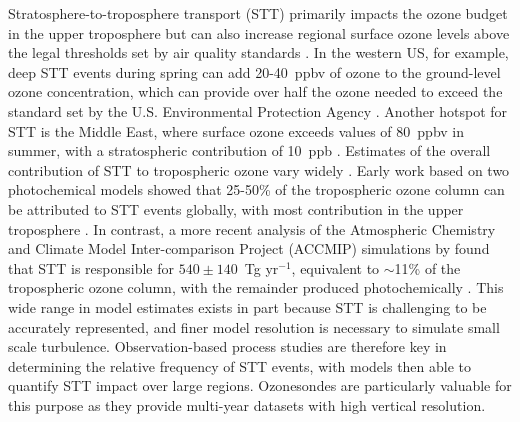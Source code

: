 \documentclass[acp, manuscript]{copernicus} %
\begin{document}
  Stratosphere-to-troposphere transport (STT) primarily impacts the ozone budget in the upper troposphere but can also increase regional surface ozone levels above the legal thresholds set by air quality standards \citep{Danielson1968, Lelieveld2009, Lefohn2011, Langford2012, Zhang2014, Lin2015}.
  In the western US, for example, deep STT events during spring can add 20-40~ppbv of ozone to the ground-level ozone concentration, which can provide over half the ozone needed to exceed the standard set by the U.S. Environmental Protection Agency \citep{Lin2012, Lin2015}.
  Another hotspot for STT is the Middle East, where surface ozone exceeds values of 80~ppbv in summer, with a stratospheric contribution of 10~ppb \citep{Lelieveld2009}.
  Estimates of the overall contribution of STT to tropospheric ozone vary widely \citep[e.g.][]{Galani2003, Stohl2003, Stevenson2006, Lefohn2011}.
  Early work based on two photochemical models showed that 25-50\% of the tropospheric ozone column can be attributed to STT events globally, with most contribution in the upper troposphere \citep{Stohl2003}.
  In contrast, a more recent analysis of the Atmospheric Chemistry and Climate Model Inter-comparison Project (ACCMIP) simulations by \citet{Young2013} found that STT is responsible for $540\pm140$~Tg yr$^{-1}$, equivalent to $\sim$11\% of the tropospheric ozone column, with the remainder produced photochemically \citep{Monks2015}.
  This wide range in model estimates exists in part because STT is challenging to be accurately represented, and finer model resolution is necessary to simulate small scale turbulence.
  Observation-based process studies are therefore key in determining the relative frequency of STT events, with models then able to quantify STT impact over large regions.
  Ozonesondes are particularly valuable for this purpose as they provide multi-year datasets with high vertical resolution.
\end{document}

